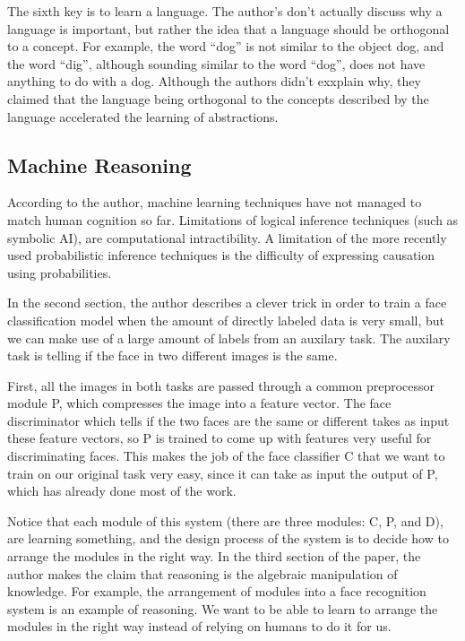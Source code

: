 \documentclass[12pt]{article}
\begin{document}
The sixth key is to learn a language. The author's don't actually discuss why a language is important, but rather the idea that a language should be orthogonal to a concept. For example, the word ``dog'' is not similar to the object dog, and the word ``dig'', although sounding similar to the word ``dog'', does not have anything to do with a dog. Although the authors didn't exxplain why, they claimed that the language being orthogonal to the concepts described by the language accelerated the learning of abstractions. 

\subsection{Machine Reasoning \cite{MachineReasoning}}

According to the author, machine learning techniques have not managed to match human cognition so far. Limitations of logical inference techniques (such as symbolic AI), are computational intractibility. A limitation of the more recently used probabilistic inference techniques is the difficulty of expressing causation using probabilities.

In the second section, the author describes a clever trick in order to train a face classification model when the amount of directly labeled data is very small, but we can make use of a large amount of labels from an auxilary task. The auxilary task is telling if the face in two different images is the same.

First, all the images in both tasks are passed through a common preprocessor module P, which compresses the image into a feature vector. The face discriminator which tells if the two faces are the same or different takes as input these feature vectors, so P is trained to come up with features very useful for discriminating faces. This makes the job of the face classifier C that we want to train on our original task very easy, since it can take as input the output of P, which has already done most of the work.

Notice that each module of this system (there are three modules: C, P, and D), are learning something, and the design process of the system is to decide how to arrange the modules in the right way. In the third section of the paper, the author makes the claim that reasoning is the algebraic manipulation of knowledge. For example, the arrangement of modules into a face recognition system is an example of reasoning. We want to be able to learn to arrange the modules in the right way instead of relying on humans to do it for us.
\end{document}
